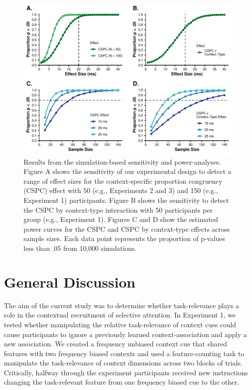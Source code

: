 \documentclass[english,,man,floatsintext]{apa6}
\begin{document}
\begin{figure}[!h]
\includegraphics[width=\textwidth]{manuscript_pretty_files/figure-latex/figure5-1} \caption{Results from the simulation-based sensitivity and power-analyses. Figure A shows the sensitivity of our experimental design to detect a range of effect sizes for the context-specific proportion congruency (CSPC) effect with 50 (e.g., Experiments 2 and 3) and 150 (e.g., Experiment 1) participants. Figure B shows the sensitivity to detect the CSPC by context-type interaction with 50 participants per group (e.g., Experiment 1). Figures C and D show the estimated power curves for the CSPC and CSPC by context-type effects across sample sizes. Each data point represents the proportion of p-values less than .05 from 10,000 simulations.}\label{fig:figure5}
\end{figure}



\hypertarget{general-discussion}{%
\section{General Discussion}\label{general-discussion}}

The aim of the current study was to determine whether task-relevance plays a role in the contextual recruitment of selective attention. In Experiment 1, we tested whether manipulating the relative task-relevance of context cues could cause participants to ignore a previously learned context-association and apply a new association. We created a frequency unbiased context cue that shared features with two frequency biased contexts and used a feature-counting task to manipulate the task-relevance of context dimensions across two blocks of trials. Critically, halfway through the experiment participants received new instructions changing the task-relevant feature from one frequency biased cue to the other.
\end{document}
